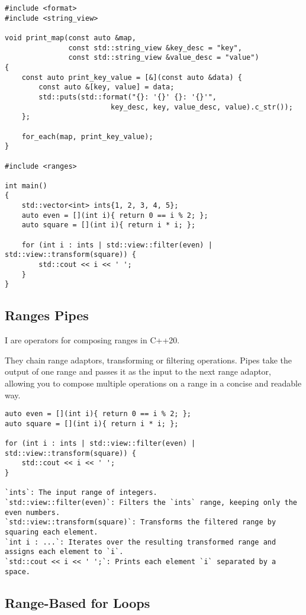 \documentclass[openany]{report}
\begin{document}
\begin{verbatim}
#include <format>
#include <string_view>

void print_map(const auto &map,
               const std::string_view &key_desc = "key",
               const std::string_view &value_desc = "value")
{
    const auto print_key_value = [&](const auto &data) { 
        const auto &[key, value] = data;
        std::puts(std::format("{}: '{}' {}: '{}'",
                         key_desc, key, value_desc, value).c_str());
    };

    for_each(map, print_key_value);
}

#include <ranges>

int main()
{
    std::vector<int> ints{1, 2, 3, 4, 5};
    auto even = [](int i){ return 0 == i % 2; };
    auto square = [](int i){ return i * i; };
                                              
    for (int i : ints | std::view::filter(even) | std::view::transform(square)) {
        std::cout << i << ' ';
    }
}
\end{verbatim}

\subsection{Ranges Pipes}

I are operators for composing ranges in C++20.

They chain range adaptors, transforming or filtering operations.
Pipes take the output of one range and passes it as the input to the next range adaptor,
allowing you to compose multiple operations on a range in a concise and readable way.

\begin{verbatim}
auto even = [](int i){ return 0 == i % 2; };
auto square = [](int i){ return i * i; };

for (int i : ints | std::view::filter(even) | std::view::transform(square)) {
    std::cout << i << ' ';
}

`ints`: The input range of integers.
`std::view::filter(even)`: Filters the `ints` range, keeping only the even numbers.
`std::view::transform(square)`: Transforms the filtered range by squaring each element.
`int i : ...`: Iterates over the resulting transformed range and assigns each element to `i`.
`std::cout << i << ' ';`: Prints each element `i` separated by a space.
\end{verbatim}

\subsection{Range-Based for Loops}
\end{document}
